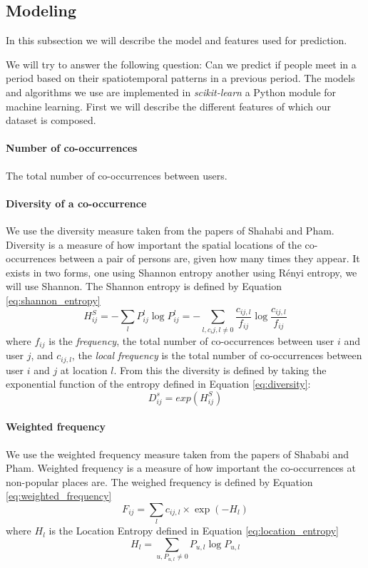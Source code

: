 \subsection{Modeling}
In this subsection we will describe the model and features used for prediction.

We will try to answer the following question: Can we predict if people meet in a period based on their spatiotemporal patterns in a previous period.
The models and algorithms we use are implemented in \textit{scikit-learn}\cite{scikit-learn} a Python module for machine learning. 
First we will describe the different features of which our dataset is composed.
\paragraph{Number of co-occurrences}
The total number of co-occurrences between users.
\paragraph{Diversity of a co-occurrence}
We use the diversity measure taken from the papers of Shahabi and Pham\cite{iRWRfSD}\cite{AEBMtISSfSD}.
Diversity is a measure of how important the spatial locations of the co-occurrences between a pair of persons are, given how many times they appear.
It exists in two forms, one using Shannon entropy another using Rényi entropy, we will use Shannon.
The Shannon entropy is defined by Equation \ref{eq:shannon_entropy}
\begin{equation}
\label{eq:shannon_entropy}
H^S_{ij}=-\sum\limits_{l}P^l_{ij} \log P^l_{ij}= -\sum\limits_{l,c_ij,l\neq 0}\frac{c_{ij,l}}{f_{ij}}\log \frac{c_{ij,l}}{f_{ij}}
\end{equation}
where $f_{ij}$ is the \textit{frequency}, the total number of co-occurrences between user $i$ and user $j$, and $c_{ij,l}$, the \textit{local frequency} is the total number of co-occurrences between user $i$ and $j$ at location $l$.
From this the diversity is defined by taking the exponential function of the entropy defined in Equation \ref{eq:diversity}:
\begin{equation}
\label{eq:diversity}
D^s_{ij} = exp(H^S_{ij})
\end{equation}

\paragraph{Weighted frequency}
We use the weighted frequency measure taken from the papers of Shababi and Pham\cite{iRWRfSD}\cite{AEBMtISSfSD}.
Weighted frequency is a measure of how important the co-occurrences at non-popular places are.
The weighed frequency is defined by Equation \ref{eq:weighted_frequency}
\begin{equation}
\label{eq:weighted_frequency}
F_{ij}=\sum\limits_{l}c_{ij,l} \times \exp(-H_l)
\end{equation}
where $H_l$ is the Location Entropy defined in Equation \ref{eq:location_entropy}
\begin{equation}
\label{eq:location_entropy}
H_l = \sum\limits_{u, P_{u,l}\neq0} P_{u,l}\log P_{u,l}
\end{equation}
